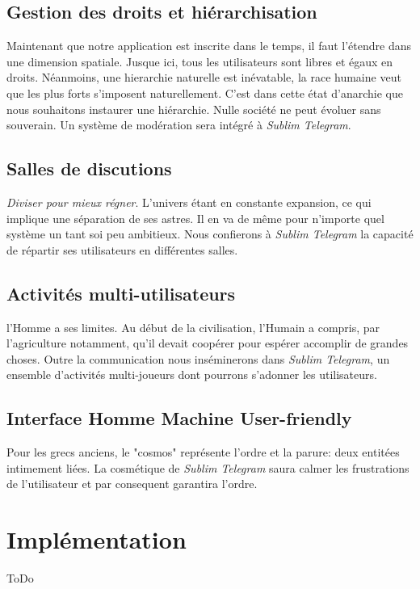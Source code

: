 \documentclass[a4paper, 12pt]{article}
\begin{document}
\subsection{Gestion des droits et hiérarchisation}
Maintenant que notre application est inscrite dans le temps, il faut l'étendre dans une dimension spatiale. Jusque ici, tous les utilisateurs sont libres et égaux en droits. Néanmoins, une hierarchie naturelle est inévatable, la race humaine veut que les plus forts s'imposent naturellement. C'est dans cette état d'anarchie que nous souhaitons instaurer une hiérarchie. Nulle société ne peut évoluer sans souverain. Un système de modération sera intégré à \emph{Sublim Telegram}.  
\subsection{Salles de discutions}
\emph{Diviser pour mieux régner}. 
L'univers étant en constante expansion, ce qui implique une séparation de ses astres. Il en va de même pour n'importe quel système un tant soi peu ambitieux. Nous confierons à \emph{Sublim Telegram} la capacité de répartir ses utilisateurs en différentes salles.  
\subsection{Activités multi-utilisateurs}
l'Homme a ses limites. Au début de la civilisation, l'Humain a compris, par l'agriculture notamment, qu'il devait coopérer pour espérer accomplir de grandes choses. Outre la communication nous inséminerons dans \emph{Sublim Telegram}, un ensemble d'activités multi-joueurs dont pourrons s'adonner les utilisateurs.
\subsection{Interface Homme Machine User-friendly}
Pour les grecs anciens, le "cosmos" représente l'ordre et la parure: deux entitées intimement liées. La cosmétique de \emph{Sublim Telegram} saura calmer les frustrations de l'utilisateur et par consequent garantira l'ordre.
\section{Implémentation}
ToDo
\end{document}
